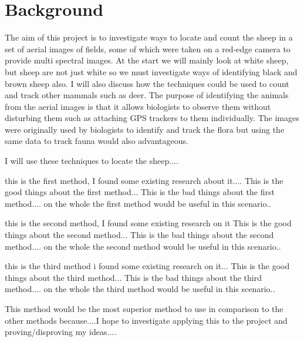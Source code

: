 \section{Background}
\begin{comment}
What was your background preparation for the project? What similar systems or research techniques did you assess? What was your motivation and interest in this project? 
\end{comment}
The aim of this project is to investigate ways to locate and count the sheep in a set of aerial images of fields, some of which were taken on a red-edge camera to provide multi spectral images. At the start we will mainly look at white sheep, but sheep are not just white so we must investigate ways of identifying black and brown sheep also. I will also discuss how the techniques could be used to count and track other mammals such as deer. The purpose of identifying the animals from the aerial images is that it allows biologists to observe them without disturbing them such as attaching GPS trackers to them individually. The images were originally used by biologists to identify and track the flora but using the same data to track fauna would also advantageous.

I will use these techniques to locate the sheep....

this is the first method, I found some existing research about it....
This is the good things about the first method...
This is the bad things about the first method....
on the whole the first method would be useful in this scenario..

this is the second method, I found some existing research on it
This is the good things about the second method...
This is the bad things about the second method....
on the whole the second method would be useful in this scenario..

this is the third method i found some existing research on it...
This is the good things about the third method...
This is the bad things about the third  method....
on the whole the third method would be useful in this scenario..

This method would be the most superior method to use in comparison to the other methods because....I hope to investigate applying this to the project and proving/disproving my ideas....

